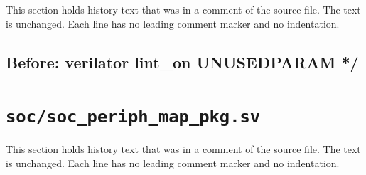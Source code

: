 This section holds history text that was in a comment of the source file. The text is unchanged. Each line has no leading comment marker and no indentation.

\begin{record}

\subsection*{Before: verilator lint\_on  UNUSEDPARAM */}


\end{record}

\section{\texttt{soc/soc\_periph\_map\_pkg.sv}}\label{cr:mod:soc-periph-map-pkg}

This section holds history text that was in a comment of the source file. The text is unchanged. Each line has no leading comment marker and no indentation.

